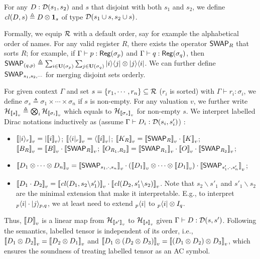 \begin{definition}
  For any $D : {\mathcal{D}}(s_1,s_2)$ and $s$ that disjoint with both $s_1$ and $s_2$, we define ${\mathit{cl}}(D,s) \triangleq D\otimes \mathbf{1}_{s}$ of type ${\mathcal{D}}(s_1\cup s, s_2\cup s)$.
\end{definition}
Formally, we equip $\mathcal{R}$ with a default order, say for example the alphabetical order of names. For any valid register $R$, there exists the operator ${\mathsf{SWAP}}_R$ that sorts $R$; for example, if $\Gamma\vdash p : \mathsf{Reg}(\sigma_p)$ and $\Gamma\vdash q : \mathsf{Reg}(\sigma_q)$, then ${\mathsf{SWAP}}_{(q,p)} \triangleq \sum_{i\in \mathbf{U}(\sigma_p)}\sum_{j\in \mathbf{U}(\sigma_q)}|i\rangle\langle j|\otimes |j\rangle\langle i|$. We can further define ${\mathsf{SWAP}}_{s_1,s_2,\cdots}$ for merging disjoint sets orderly.

For given context $\Gamma$ and set $s = \{r_1,\cdots,r_n\}\subseteq\mathcal{R}$ ($r_i$ is sorted) with $\Gamma\vdash r_i : \sigma_i$, we define $\sigma_s\triangleq \sigma_1\times\cdots\times\sigma_n$ if $s$ is non-empty. \label{context: sigma s}
For any valuation $v$, we further write ${\mathcal{H}}_{{\llbracket s \rrbracket}_v} \triangleq \bigotimes_{i}{\mathcal{H}}_{{\llbracket \sigma_i \rrbracket}_v}$ which equals to ${\mathcal{H}}_{{\llbracket \sigma_s \rrbracket}_v}$ for non-empty $s$.
We interpret labelled Dirac notations inductively as (assume $\Gamma\vdash D_i : {\mathcal{D}}(s_i,s'_i)$) :
\begin{itemize}
  \item ${\llbracket |i\rangle_r \rrbracket}_v = |{\llbracket i \rrbracket}_v\rangle$;\quad 
        ${\llbracket \langle i|_r \rrbracket}_v = \langle{\llbracket i \rrbracket}_v|$;\quad  
        ${\llbracket K_R \rrbracket}_v = {\llbracket {\mathsf{SWAP}}_R \rrbracket}_v \cdot {\llbracket K \rrbracket}_v$; \\
        ${\llbracket B_R \rrbracket}_v = {\llbracket B \rrbracket}_v\cdot {\llbracket {\mathsf{SWAP}}_R \rrbracket}_v$;\quad
        ${\llbracket O_{R_1,R_2} \rrbracket} = {\llbracket {\mathsf{SWAP}}_{R_1} \rrbracket}_v\cdot {\llbracket O \rrbracket}_v\cdot {\llbracket {\mathsf{SWAP}}_{R_2} \rrbracket}_v$;
  \item ${\llbracket D_1\otimes \cdots \otimes D_n \rrbracket}_v = {\llbracket {\mathsf{SWAP}}_{s_1,\cdot,s_n} \rrbracket}_v\cdot ({\llbracket D_1 \rrbracket}_v\otimes \cdots \otimes {\llbracket D_1 \rrbracket}_v)\cdot {\llbracket {\mathsf{SWAP}}_{s'_1,\cdot,s'_n} \rrbracket}_v$;
  \item ${\llbracket D_1\cdot D_2 \rrbracket}_v = {\llbracket {\mathit{cl}}(D_1, s_2\backslash s'_1) \rrbracket}_v\cdot {\llbracket {\mathit{cl}}(D_2, s'_1\backslash s_2) \rrbracket}_v$. Note that $s_2\backslash s'_1$ and $s'_1\backslash s_2$ are the minimal extension that make it interpretable. E.g., to interpret ${}_p\langle i|\cdot |j\rangle_{p,q}$, we at least need to extend ${}_p\langle i|$ to ${}_p\langle i|\otimes I_{q}$.
\end{itemize}
Thus, ${\llbracket D \rrbracket}_v$ is a linear map from ${\mathcal{H}}_{{\llbracket s' \rrbracket}_v}$ to ${\mathcal{H}}_{{\llbracket s \rrbracket}_v}$ given $\Gamma\vdash D : {\mathcal{D}}(s,s')$. Following the semantics, labelled tensor is independent of its order, i.e., ${\llbracket D_1\otimes D_2 \rrbracket}_v = {\llbracket D_2\otimes D_1 \rrbracket}_v$ and ${\llbracket D_1\otimes (D_2\otimes D_3) \rrbracket}_v = {\llbracket (D_1\otimes D_2)\otimes D_3 \rrbracket}_v$, which ensures the soundness of treating labelled tensor as an AC symbol.

